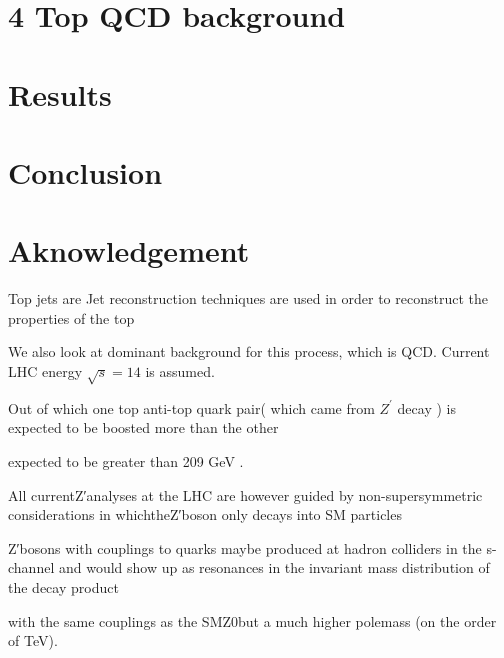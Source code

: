 \documentclass[12pt,a4paper]{article}		%
\begin{document}
\section{4 Top QCD background}
\newpage
\section{Results}
\newpage
\section{Conclusion}
\newpage
\section{Aknowledgement}	 
	\newpage 

   Top jets are Jet reconstruction techniques are used in order to reconstruct the properties of the top     

We also look at dominant background for this process, which is QCD.  Current LHC energy $\sqrt{s} = 14$ is assumed. 


Out of which one top anti-top quark pair( which came from $Z^\prime$ decay ) is expected to be boosted more than the other  


 
expected to be greater than 209 GeV .


  All currentZ′analyses at the LHC are however guided by non-supersymmetric considerations in whichtheZ′boson only decays into SM particles  

Z′bosons with couplings to quarks maybe produced at hadron colliders in the s-channel and would show up as resonances in the invariant mass distribution of the decay product
 

with  the  same  couplings  as  the  SMZ0but a much higher polemass (on the order of TeV).     
\end{document}
